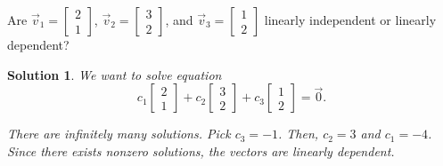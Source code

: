 \documentclass[]{book}
\newtheorem*{solution}{Solution}
\begin{document}
\begin{example}
    Are $\vec{v}_1 = \begin{bmatrix}2 \\ 1\end{bmatrix}$, $\vec{v}_2 = \begin{bmatrix}3 \\ 2\end{bmatrix}$, and $\vec{v}_3 = \begin{bmatrix}1 \\ 2\end{bmatrix}$ linearly independent or linearly dependent?
\begin{solution}
    We want to solve equation \[c_1\begin{bmatrix}2 \\ 1\end{bmatrix} + c_2\begin{bmatrix}3 \\ 2\end{bmatrix} + c_3\begin{bmatrix}1 \\ 2\end{bmatrix} = \vec{0}.\]
    
    There are infinitely many solutions. Pick $c_3=-1$. Then, $c_2=3$ and $c_1=-4$. Since there exists nonzero solutions, the vectors are linearly dependent. \hfill\qedsymbol
\end{solution}
\end{example}
\end{document}
